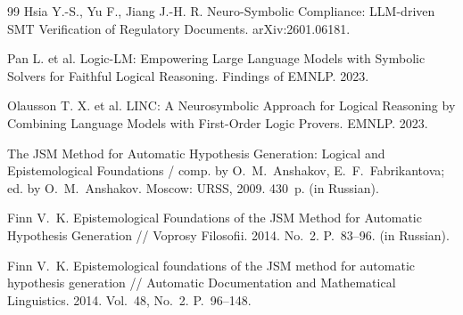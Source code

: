 \documentclass[12pt,a4paper]{article}
\begin{document}
\begin{thebibliography}{99}
	 Hsia Y.-S., Yu F., Jiang J.-H. R. Neuro-Symbolic Compliance: LLM-driven SMT Verification of Regulatory Documents. arXiv:2601.06181.

	 Pan L. et al. Logic-LM: Empowering Large Language Models with Symbolic Solvers for Faithful Logical Reasoning. Findings of EMNLP. 2023.

	 Olausson T. X. et al. LINC: A Neurosymbolic Approach for Logical Reasoning by Combining Language Models with First-Order Logic Provers. EMNLP. 2023.

	 The JSM Method for Automatic Hypothesis Generation: Logical and Epistemological Foundations / comp. by O.~M.~Anshakov, E.~F.~Fabrikantova; ed. by O.~M.~Anshakov. Moscow: URSS, 2009. 430~p. (in Russian).

	 Finn V.~K. Epistemological Foundations of the JSM Method for Automatic Hypothesis Generation // Voprosy Filosofii. 2014. No.~2. P.~83--96. (in Russian).

	 Finn V.~K. Epistemological foundations of the JSM method for automatic hypothesis generation // Automatic Documentation and Mathematical Linguistics. 2014. Vol.~48, No.~2. P.~96--148.

	\end{thebibliography}
\end{document}
